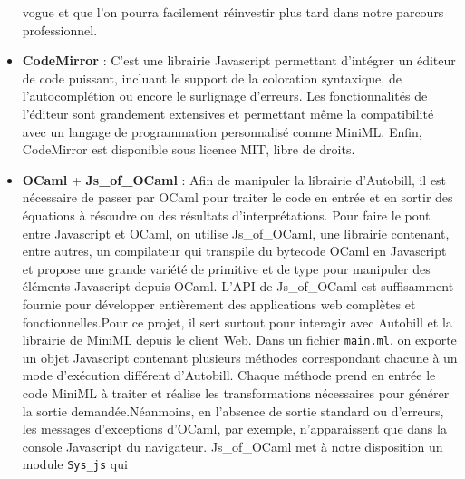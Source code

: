 \documentclass[12pt]{article}
\begin{document}
\begin{itemize}
                  vogue et que l'on pourra facilement réinvestir plus tard dans notre
                  parcours professionnel.
            \item
                  \textbf{CodeMirror} \cite{codemirror}:
                  C'est une librairie Javascript permettant d'intégrer un éditeur de
                  code puissant, incluant le support de la coloration syntaxique, de
                  l'autocomplétion ou encore le surlignage d'erreurs. Les
                  fonctionnalités de l'éditeur sont grandement extensives et permettant
                  même la compatibilité avec un langage de programmation personnalisé
                  comme MiniML. Enfin, CodeMirror est disponible sous licence MIT, libre
                  de droits.
            \item
                  \textbf{OCaml} \cite{Minsky_OCaml}
                  \cite{chailloux}
                  \cite{Leroy} + \textbf{Js\_of\_OCaml}
                  \cite{js_of_OCaml}: Afin de manipuler la
                  librairie d'Autobill, il est nécessaire de passer par OCaml pour
                  traiter le code en entrée et en sortir des équations à résoudre ou des
                  résultats d'interprétations. Pour faire le pont entre Javascript et
                  OCaml, on utilise Js\_of\_OCaml, une librairie contenant, entre
                  autres, un compilateur qui transpile du bytecode OCaml en Javascript
                  et propose une grande variété de primitive et de type pour manipuler
                  des éléments Javascript depuis OCaml. L'API de Js\_of\_OCaml est
                  suffisamment fournie pour développer entièrement des applications web
                  complètes et fonctionnelles.\newline  Pour ce projet, il sert surtout
                  pour interagir avec Autobill et la librairie de MiniML depuis le
                  client Web. Dans un fichier \texttt{main.ml}, on exporte un objet
                  Javascript contenant plusieurs méthodes correspondant chacune à un
                  mode d'exécution différent d'Autobill. Chaque méthode prend en entrée
                  le code MiniML à traiter et réalise les transformations nécessaires
                  pour générer la sortie demandée.\newline  Néanmoins, en l'absence de
                  sortie standard ou d'erreurs, les messages d'exceptions d'OCaml, par
                  exemple, n'apparaissent que dans la console Javascript du navigateur.
                  Js\_of\_OCaml met à notre disposition un module \texttt{Sys\_js} qui

\end{itemize}
\end{document}

